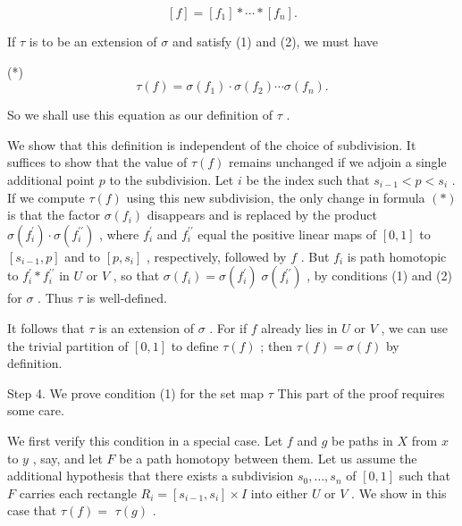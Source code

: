 \[
\left\lbrack  f\right\rbrack   = \left\lbrack  {f}_{1}\right\rbrack   * \cdots  * \left\lbrack  {f}_{n}\right\rbrack  .
\]

If \(\tau\) is to be an extension of \(\sigma\) and satisfy (1) and (2), we must have

(*)
\[
\tau \left( f\right)  = \sigma \left( {f}_{1}\right)  \cdot  \sigma \left( {f}_{2}\right) \cdots \sigma \left( {f}_{n}\right) .
\]

So we shall use this equation as our definition of \(\tau\) .

We show that this definition is independent of the choice of subdivision. It suffices to show that the value of \(\tau \left( f\right)\) remains unchanged if we adjoin a single additional point \(p\) to the subdivision. Let \(i\) be the index such that \({s}_{i - 1} < p < {s}_{i}\) . If we compute \(\tau \left( f\right)\) using this new subdivision, the only change in formula \(\left( *\right)\) is that the factor \(\sigma \left( {f}_{i}\right)\) disappears and is replaced by the product \(\sigma \left( {f}_{i}^{\prime }\right)  \cdot  \sigma \left( {f}_{i}^{\prime \prime }\right)\) , where \({f}_{i}^{\prime }\) and \({f}_{i}^{\prime \prime }\) equal the positive linear maps of \(\left\lbrack  {0,1}\right\rbrack\) to \(\left\lbrack  {{s}_{i - 1},p}\right\rbrack\) and to \(\left\lbrack  {p,{s}_{i}}\right\rbrack\) , respectively, followed by \(f\) . But \({f}_{i}\) is path homotopic to \({f}_{i}^{\prime } * {f}_{i}^{\prime \prime }\) in \(U\) or \(V\) , so that \(\sigma \left( {f}_{i}\right)  = \sigma \left( {f}_{i}^{\prime }\right) \;\sigma \left( {f}_{i}^{\prime \prime }\right)\) , by conditions (1) and (2) for \(\sigma\) . Thus \(\tau\) is well-defined.

It follows that \(\tau\) is an extension of \(\sigma\) . For if \(f\) already lies in \(U\) or \(V\) , we can use the trivial partition of \(\left\lbrack  {0,1}\right\rbrack\) to define \(\tau \left( f\right)\) ; then \(\tau \left( f\right)  = \sigma \left( f\right)\) by definition.

Step 4. We prove condition (1) for the set map \(\tau\) This part of the proof requires some care.

We first verify this condition in a special case. Let \(f\) and \(g\) be paths in \(X\) from \(x\) to \(y\) , say, and let \(F\) be a path homotopy between them. Let us assume the additional hypothesis that there exists a subdivision \({s}_{0},\ldots ,{s}_{n}\) of \(\left\lbrack  {0,1}\right\rbrack\) such that \(F\) carries each rectangle \({R}_{i} = \left\lbrack  {{s}_{i - 1},{s}_{i}}\right\rbrack   \times  I\) into either \(U\) or \(V\) . We show in this case that \(\tau \left( f\right)  =\)  \(\tau \left( g\right)\) .

